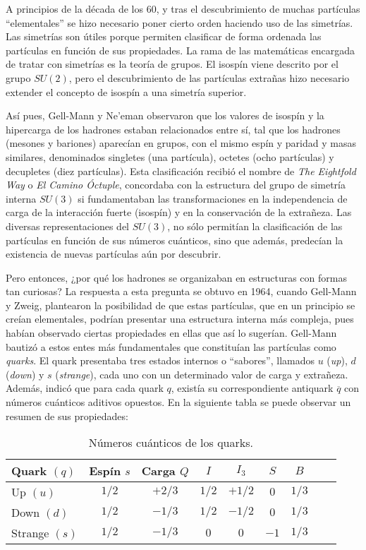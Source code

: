 A principios de la década de los 60, y tras el descubrimiento de muchas partículas ``elementales'' se hizo necesario poner cierto orden haciendo uso de las simetrías. Las simetrías son útiles porque permiten clasificar de forma ordenada las partículas en función de sus propiedades. La rama de las matemáticas encargada de tratar con simetrías es la teoría de grupos. El isospín viene descrito por el grupo $SU(2)$, pero el descubrimiento de las partículas extrañas hizo necesario extender el concepto de isospín a una simetría superior.

Así pues, Gell-Mann y Ne'eman observaron que los valores de isospín y la hipercarga de los hadrones estaban relacionados entre sí, tal que los hadrones (mesones y bariones) aparecían en grupos, con el mismo espín y paridad y masas similares, denominados singletes (una partícula), octetes (ocho partículas) y decupletes (diez partículas).  Esta clasificación recibió el nombre de \textit{The Eightfold Way} o \textit{El Camino Óctuple}, concordaba con la estructura del grupo de simetría interna $SU(3)$ si fundamentaban las transformaciones en la independencia de carga de la interacción fuerte (isospín) y en la conservación de la extrañeza.\cite{notas2020} Las diversas representaciones del $SU(3)$, no sólo permitían la clasificación de las partículas en función de sus números cuánticos, sino que además, predecían la existencia de nuevas partículas aún por descubrir. 

Pero entonces, ¿por qué los hadrones se organizaban en estructuras con formas tan curiosas? La respuesta a esta pregunta se obtuvo en 1964, cuando Gell-Mann y Zweig, plantearon la posibilidad de que estas partículas, que en un principio se creían elementales, podrían presentar una estructura interna más compleja, pues habían observado ciertas propiedades en ellas que así lo sugerían. Gell-Mann bautizó a estos entes más fundamentales que constituían las partículas como \textit{quarks}.\cite{Griffiths2008} El quark presentaba tres estados internos o ``sabores'', llamados $u$ (\textit{up}), $d$ (\textit{down}) y $s$ (\textit{strange}), cada uno con un determinado valor de carga y extrañeza. Además, indicó que para cada quark $q$, existía su correspondiente antiquark $\overline{q}$ con números cuánticos aditivos opuestos. En la siguiente tabla se puede observar un resumen de sus propiedades:

\begin{table}[h]
	\centering
	\begin{tabular}{l*{7}{c}r}
\hline
Quark $(q)$ & Espín $s$ & Carga $Q$ & $I$ & $I_3$ & $S$ & $B$\\ 
\hline
Up $(u)$ & $1/2$ & $+2/3$ & $1/2$ & $+1/2$ & $0$ & $1/3$\\
Down $(d)$ & $1/2$ & $-1/3$ & $1/2$ & $-1/2$ & $0$ & $1/3$\\
Strange $(s)$ & $1/2$ & $-1/3$ & $0$ & $0$ & $-1$ & $1/3$\\
\hline
	\end{tabular}
\caption{Números cuánticos de los quarks. \cite{notas2020}} %
\label{tab:propiedades_quarks}
\end{table}

